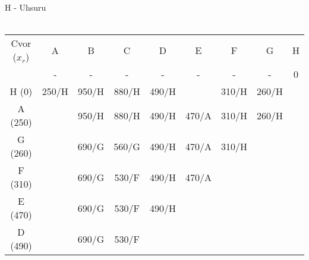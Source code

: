 \documentclass[12pt]{article}
\begin{document}
\begin{enumerate}
\begin{tabular}{|c|c|c|c|c|c|c|c|c|}
\end{tabular}
\\
\\
H - Uhsuru
\\
\\
\begin{tabular}{|c|c|c|c|c|c|c|c|c|}
\hline
Cvor ($x_r$) & A                            & B                            & C                            & D                            & E                            & F                            & G                            & H                        \\ \cline{2-9} 
             & {\color[HTML]{000000} -}     & {\color[HTML]{333333} -}     & {\color[HTML]{333333} -}     & -                            & -                            & {\color[HTML]{333333} -}     & {\color[HTML]{333333} -}     & {\color[HTML]{FE0000} 0} \\ \hline
H (0)        & {\color[HTML]{FE0000} 250/H} & 950/H                        & {\color[HTML]{333333} 880/H} & {\color[HTML]{333333} 490/H} & {\color[HTML]{333333} }      & {\color[HTML]{333333} 310/H} & {\color[HTML]{333333} 260/H} &                          \\ \hline
A (250)      &                              & 950/H                        & 880/H                        & 490/H                        & 470/A                        & {\color[HTML]{333333} 310/H} & {\color[HTML]{FE0000} 260/H} & {\color[HTML]{FE0000} }  \\ \hline
G (260)      &                              & 690/G                        & {\color[HTML]{333333} 560/G} & {\color[HTML]{333333} 490/H} & {\color[HTML]{333333} 470/A} & {\color[HTML]{FE0000} 310/H} & {\color[HTML]{333333} }      & {\color[HTML]{FE0000} }  \\ \hline
F (310)      &                              & 690/G                        & {\color[HTML]{000000} 530/F} & {\color[HTML]{333333} 490/H} & {\color[HTML]{FE0000} 470/A} & {\color[HTML]{333333} }      & {\color[HTML]{333333} }      & {\color[HTML]{FE0000} }  \\ \hline
E (470)      & {\color[HTML]{FE0000} }      & {\color[HTML]{333333} 690/G} & {\color[HTML]{333333} 530/F} & {\color[HTML]{FE0000} 490/H} & {\color[HTML]{FE0000} }      &                              & {\color[HTML]{FE0000} }      &                          \\ \hline
D (490)      & {\color[HTML]{333333} }      & {\color[HTML]{333333} 690/G} & {\color[HTML]{FE0000} 530/F} & {\color[HTML]{FE0000} }      & {\color[HTML]{FE0000} }      &                              &                              &                          \\ \hline

\end{tabular}
\end{enumerate}
\end{document}
